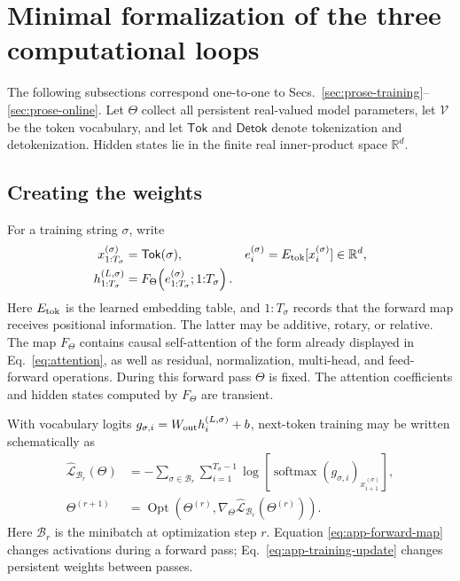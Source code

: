 \documentclass[
  aps,
  reprint,
  superscriptaddress,
  floatfix,
  nofootinbib,
  longbibliography
]{revtex4-2}
\newcommand{\R}{\mathbb{R}}
\begin{document}
\appendix

\section{Minimal formalization of the three computational loops}
\label{app:llm-loops}

The following subsections correspond one-to-one to
Secs.~\ref{sec:prose-training}--\ref{sec:prose-online}.  Let $\Theta$ collect
all persistent real-valued model parameters, let $\mathcal V$ be the token
vocabulary, and let $\mathsf{Tok}$ and $\mathsf{Detok}$ denote tokenization and
detokenization.  Hidden states lie in the finite real inner-product space
$\R^d$.

\subsection{Creating the weights}
\label{app:training}

For a training string $\sigma$, write
%
\begin{align}
x_{1:T_\sigma}^{(\sigma)}
&=\mathsf{Tok}(\sigma),
&e_i^{(\sigma)}
&=E_{\rm tok}[x_i^{(\sigma)}]\in\R^d,
\nonumber\\
h_{1:T_\sigma}^{(L,\sigma)}
&=F_\Theta\!\left(e_{1:T_\sigma}^{(\sigma)};1{:}T_\sigma\right).
\label{eq:app-forward-map}
\end{align}
%
Here $E_{\rm tok}$ is the learned embedding table, and $1{:}T_\sigma$ records
that the forward map receives positional information.  The latter may be
additive, rotary, or relative.  The map $F_\Theta$ contains causal
self-attention of the form already displayed in Eq.~\eqref{eq:attention}, as
well as residual, normalization, multi-head, and feed-forward operations.
During this forward pass $\Theta$ is fixed.  The attention coefficients and
hidden states computed by $F_\Theta$ are transient.

With vocabulary logits
$g_{\sigma,i}=W_{\rm out}h_i^{(L,\sigma)}+b$, next-token training may be
written schematically as
%
\begin{align}
\widehat{\mathcal L}_{\mathcal B_r}(\Theta)
&=-\sum_{\sigma\in\mathcal B_r}
\sum_{i=1}^{T_\sigma-1}
\log\!\left[
\operatorname{softmax}(g_{\sigma,i})_{x_{i+1}^{(\sigma)}}
\right],\nonumber\\
\Theta^{(r+1)}
&=\operatorname{Opt}\!\left(
\Theta^{(r)},
\nabla_\Theta\widehat{\mathcal L}_{\mathcal B_r}
(\Theta^{(r)})
\right).
\label{eq:app-training-update}
\end{align}
%
Here $\mathcal B_r$ is the minibatch at optimization step $r$.  Equation
\eqref{eq:app-forward-map} changes activations during a forward pass;
Eq.~\eqref{eq:app-training-update} changes persistent weights between passes.
\end{document}
